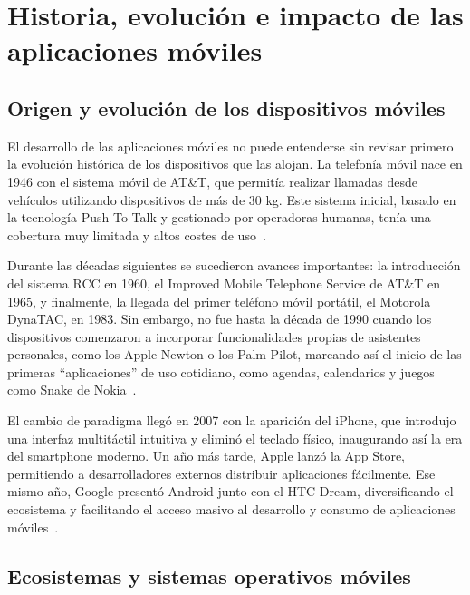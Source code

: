 


\section{Historia, evolución e impacto de las aplicaciones móviles}

\subsection{Origen y evolución de los dispositivos móviles}

El desarrollo de las aplicaciones móviles no puede entenderse sin revisar primero la evolución histórica de los dispositivos que las alojan. La telefonía móvil nace en 1946 con el sistema móvil de AT\&T, que permitía realizar llamadas desde vehículos utilizando dispositivos de más de 30 kg. Este sistema inicial, basado en la tecnología Push-To-Talk y gestionado por operadoras humanas, tenía una cobertura muy limitada y altos costes de uso~\cite{agar2004}.

Durante las décadas siguientes se sucedieron avances importantes: la introducción del sistema RCC en 1960, el Improved Mobile Telephone Service de AT\&T en 1965, y finalmente, la llegada del primer teléfono móvil portátil, el Motorola DynaTAC, en 1983. Sin embargo, no fue hasta la década de 1990 cuando los dispositivos comenzaron a incorporar funcionalidades propias de asistentes personales, como los Apple Newton o los Palm Pilot, marcando así el inicio de las primeras ``aplicaciones'' de uso cotidiano, como agendas, calendarios y juegos como Snake de Nokia~\cite{west2010}.

El cambio de paradigma llegó en 2007 con la aparición del iPhone, que introdujo una interfaz multitáctil intuitiva y eliminó el teclado físico, inaugurando así la era del smartphone moderno. Un año más tarde, Apple lanzó la App Store, permitiendo a desarrolladores externos distribuir aplicaciones fácilmente. Ese mismo año, Google presentó Android junto con el HTC Dream, diversificando el ecosistema y facilitando el acceso masivo al desarrollo y consumo de aplicaciones móviles~\cite{murphy2014}.

\subsection{Ecosistemas y sistemas operativos móviles}

